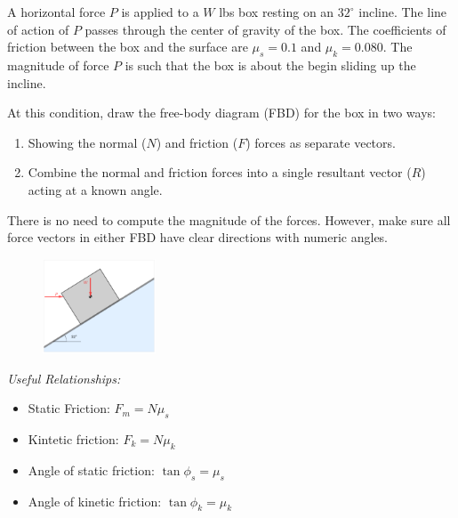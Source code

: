 
\noindent A horizontal force $P$ is applied to a $W$ lbs box resting on an $32^\circ$ incline.  The line of action of $P$ passes through the center of gravity of the box.  The coefficients of friction between the box and the surface are $\mu_s = 0.1$ and $\mu_k = 0.080$.  The magnitude of force $P$ is such that the box is about the begin sliding up the incline.

\noindent At this condition, draw the free-body diagram (FBD) for the box in two ways:
\begin{enumerate}
  \item Showing the normal ($N$) and friction ($F$) forces as separate vectors.
  \item Combine the normal and friction forces into a single resultant vector ($R$) acting at a known angle.
\end{enumerate}

\noindent There is no need to compute the magnitude of the forces.  However, make sure all force vectors in either FBD have clear directions with numeric angles.

\begin{figure}[ht!]
  \centering
  \includegraphics[width=0.3\textwidth,height=0.5\textheight,keepaspectratio]{fig.png}
\end{figure}

\textit{Useful Relationships:}
\begin{itemize}
  \item Static Friction: $F_m = N \mu_s$
  \item Kintetic friction: $F_k = N \mu_k$
  \item Angle of static friction: $\tan \phi_s = \mu_s$
  \item Angle of kinetic friction: $\tan \phi_k = \mu_k$
\end{itemize}
